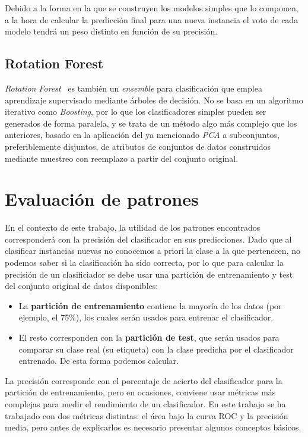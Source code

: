 Debido a la forma en la que se construyen los modelos simples que lo componen, a la hora de calcular la predicción final para una nueva instancia el voto de cada modelo tendrá un peso distinto en función de su precisión.  

\subsection{Rotation Forest}

\textit{Rotation Forest}~\cite{rodriguez2006rotation} es también un \textit{ensemble} para clasificación que emplea aprendizaje supervisado mediante árboles de decisión. No se basa en un algoritmo iterativo como \textit{Boosting}, por lo que los clasificadores simples pueden ser generados de forma paralela, y se trata de un método algo más complejo que los anteriores, basado en la aplicación del ya mencionado \textit{PCA} a subconjuntos, preferiblemente disjuntos, de atributos de conjuntos de datos construidos mediante muestreo con reemplazo a partir del conjunto original. 

\section{Evaluación de patrones}

En el contexto de este trabajo, la utilidad de los patrones encontrados corresponderá con la precisión del clasificador en sus predicciones. Dado que al clasificar instancias nuevas no conocemos a priori la clase a la que pertenecen, no podemos saber si la clasificación ha sido correcta, por lo que para calcular la precisión de un clasificiador se debe usar una partición de entrenamiento y test del conjunto original de datos disponibles:  
\begin{itemize}
	\item La \textbf{partición de entrenamiento} contiene la mayoría de los datos (por ejemplo, el 75\%), los cuales serán usados para entrenar el clasificador. 
	\item El resto corresponden con la \textbf{partición de test}, que serán usados para comparar su clase real (su etiqueta) con la clase predicha por el clasificador entrenado. De esta forma podemos calcular. 
\end{itemize} 

La precisión corresponde con el porcentaje de acierto del clasificador para la partición de entrenamiento, pero en ocasiones, conviene usar métricas más complejas para medir el rendimiento de un clasificador. En este trabajo se ha trabajado con dos métricas distintas: el área bajo la curva ROC y la precisión media, pero antes de explicarlos es necesario presentar algunos conceptos básicos.  

